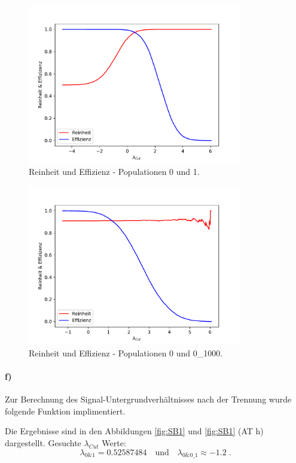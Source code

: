 \begin{figure}
  \centering
  \includegraphics[height = 7cm]{plots/ReinheitEffizienzplot.pdf}
  \caption{Reinheit und Effizienz - Populationen 0 und 1.}
  \label{fig:RE1}
\end{figure}
\begin{figure}
  \centering
  \includegraphics[height = 7cm]{plots/2ReinheitEffizienzplot.pdf}
  \caption{Reinheit und Effizienz - Populationen 0 und 0\_1000.}
  \label{fig:RE2}
\end{figure}
\FloatBarrier
\paragraph{f)}
Zur Berechnung des Signal-Untergrundverhältnisses nach der Trennung wurde folgende Funktion implimentiert. 

Die Ergebnisse sind in den Abbildungen \ref{fig:SB1} und \ref{fig:SB1} (AT h) dargestellt. 
Gesuchte $\lambda_{Cut}$ Werte:
\begin{equation}
\lambda_{0\&1} = 0.52587484 \quad \text{und} \quad \lambda_{0\&0\_1} \approx -1.2 \; .	
\end{equation}


